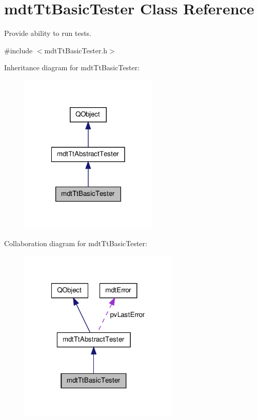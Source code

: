\hypertarget{classmdt_tt_basic_tester}{\section{mdt\-Tt\-Basic\-Tester Class Reference}
\label{classmdt_tt_basic_tester}
}


Provide ability to run tests.  




{\ttfamily \#include $<$mdt\-Tt\-Basic\-Tester.\-h$>$}



Inheritance diagram for mdt\-Tt\-Basic\-Tester\-:\nopagebreak
\begin{figure}[H]
\begin{center}
\leavevmode
\includegraphics[width=186pt]{classmdt_tt_basic_tester__inherit__graph}
\end{center}
\end{figure}


Collaboration diagram for mdt\-Tt\-Basic\-Tester\-:\nopagebreak
\begin{figure}[H]
\begin{center}
\leavevmode
\includegraphics[width=216pt]{classmdt_tt_basic_tester__coll__graph}
\end{center}
\end{figure}
